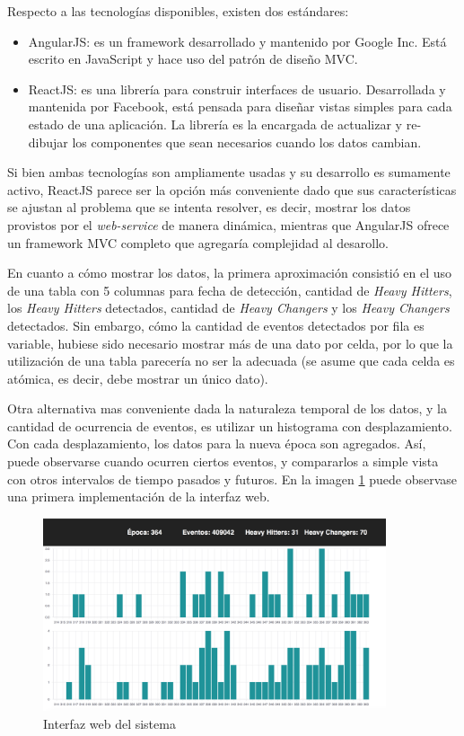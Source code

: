 \documentclass[a4paper,10pt, oneside]{article}
\begin{document}
Respecto a las tecnologías disponibles, existen dos estándares:
\begin{itemize}
	\item AngularJS: es un framework desarrollado y mantenido por Google Inc. Está escrito en JavaScript y hace uso del patrón de diseño MVC.
	\item ReactJS: es una librería para construir interfaces de usuario. Desarrollada y mantenida por Facebook, está pensada para diseñar vistas simples para cada estado de una aplicación. La librería es la encargada de actualizar y re-dibujar los componentes que sean necesarios cuando los datos cambian.
\end{itemize}

Si bien ambas tecnologías son ampliamente usadas y su desarrollo es sumamente activo, ReactJS parece ser la opción más conveniente dado que sus características se ajustan al problema que se intenta resolver, es decir, mostrar los datos provistos por el \textit{web-service} de manera dinámica, mientras que AngularJS ofrece un framework MVC completo que agregaría complejidad al desarollo.

En cuanto a cómo mostrar los datos, la primera aproximación consistió en el uso de una tabla con 5 columnas para fecha de detección, cantidad de \textit{Heavy Hitters}, los \textit{Heavy Hitters} detectados, cantidad de \textit{Heavy Changers} y los \textit{Heavy Changers} detectados. Sin embargo, cómo la cantidad de eventos detectados por fila es variable, hubiese sido necesario mostrar más de una dato por celda, por lo que la utilización de una tabla parecería no ser la adecuada (se asume que cada celda es atómica, es decir, debe mostrar un único dato).

Otra alternativa mas conveniente dada la naturaleza temporal de los datos, y la cantidad de ocurrencia de eventos, es utilizar un histograma con desplazamiento. Con cada desplazamiento, los datos para la nueva época son agregados. Así, puede observarse cuando ocurren ciertos eventos, y compararlos a simple vista con otros intervalos de tiempo pasados y futuros. En la imagen \ref{fig:ui} puede observase una primera implementación de la interfaz web.

\begin{figure}[htbp]
	\centering
	\includegraphics[width=0.9\textwidth]{./graph/ui.png}
	\caption{Interfaz web del sistema}
	\label{fig:ui}
\end{figure}
\end{document}
